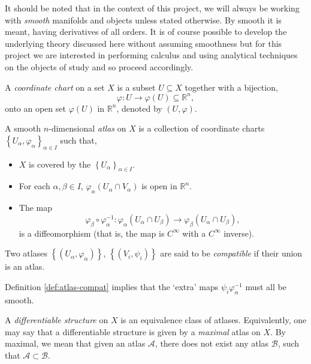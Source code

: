 \documentclass[12pt,a4paper]{article}
\begin{document}
It should be noted that in the context of this project, we will always be working with \textit{smooth} manifolds and objects unless stated otherwise. By smooth it is meant, having derivatives of all orders. It is of course possible to develop the underlying theory discussed here without assuming smoothness but for this project we are interested in performing calculus and using analytical techniques on the objects of study and so proceed accordingly.
\begin{definition}
A \textit{coordinate chart} on a set $X$ is a subset $U\subseteq X$ together with a bijection, $$\varphi :U\to\varphi(U)\subseteq\mathbb{R}^n,$$ onto an open set $\varphi(U)$ in $\mathbb{R}^n$, denoted by $(U,\varphi)$.
\end{definition}
\begin{definition}
A smooth $n$-dimensional \textit{atlas} on $X$ is a collection of coordinate charts $\left\{U_\alpha,\varphi_\alpha\right\}_{\alpha\in I}$ such that,
\begin{itemize}
\item $X$ is covered by the $\left\{U_\alpha\right\}_{\alpha\in I}$.
\item For each $\alpha,\beta\in I$, $\varphi_\alpha\left(U_\alpha\cap V_\alpha\right)$ is open in $\mathbb{R}^n$.
\item The map $$\varphi_\beta\circ\varphi_{\alpha}^{-1}:\varphi_\alpha\left(U_\alpha\cap U_\beta\right)\to\varphi_\beta\left(U_\alpha\cap U_\beta\right),$$ is a diffeomorphism (that is, the map is $C^{\infty}$ with a $C^{\infty}$ inverse).
\end{itemize}
\end{definition}
\begin{definition}
\label{def:atlas-compat}
Two atlases $\left\{\left(U_\alpha,\varphi_\alpha \right) \right\}$, $\left\{\left(V_i,\psi_i \right) \right\}$ are said to be \textit{compatible} if their union is an atlas.
\end{definition}
Definition \ref{def:atlas-compat} implies that the `extra' maps $\psi_i\varphi^{-1}_\alpha$ must all be smooth.
\begin{definition}
A \textit{differentiable structure} on $X$ is an equivalence class of atlases. Equivalently, one may say that a differentiable structure is given by a \textit{maximal} atlas on $X$. By maximal, we mean that given an atlas $\mathcal{A}$, there does not exist any atlas $\mathcal{B}$, such that $\mathcal{A}\subset \mathcal{B}$. 
\end{definition}
\end{document}
